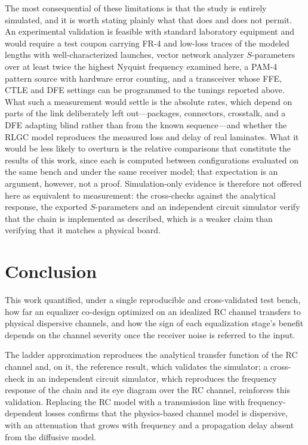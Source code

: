 \documentclass[twocolumn]{USG}
\begin{document}
The most consequential of these limitations is that the study is entirely
simulated, and it is worth stating plainly what that does and does not permit.
An experimental validation is feasible with standard laboratory equipment and
would require a test coupon carrying FR-4 and low-loss traces of the modeled
lengths with well-characterized launches, vector network analyzer
$S$-parameters over at least twice the highest Nyquist frequency examined
here, a PAM-4 pattern source with hardware error counting, and a transceiver
whose FFE, CTLE and DFE settings can be programmed to the tunings reported
above. What such a measurement would settle is the absolute rates, which
depend on parts of the link deliberately left out---packages, connectors,
crosstalk, and a DFE adapting blind rather than from the known sequence---and
whether the RLGC model reproduces the measured loss and delay of real
laminates. What it would be less likely to overturn is the relative
comparisons that constitute the results of this work, since each is computed
between configurations evaluated on the same bench and under the same receiver
model; that expectation is an argument, however, not a proof. Simulation-only
evidence is therefore not offered here as equivalent to measurement: the
cross-checks against the analytical response, the exported $S$-parameters and
an independent circuit simulator verify that the chain is implemented as
described, which is a weaker claim than verifying that it matches a physical
board.

\section{Conclusion}
\label{sec:conclusion}

This work quantified, under a single reproducible and cross-validated test
bench, how far an equalizer co-design optimized on an idealized RC channel
transfers to physical dispersive channels, and how the sign of each
equalization stage's benefit depends on the channel severity once the
receiver noise is referred to the input.

The ladder approximation reproduces the analytical transfer function of the
RC channel and, on it, the reference result, which validates the simulator;
a cross-check in an independent circuit simulator, which reproduces the
frequency response of the chain and its eye diagram over the RC channel,
reinforces this validation. Replacing the RC model with a transmission line
with frequency-dependent losses confirms that the physics-based channel model is
dispersive, with an attenuation that grows with frequency and a propagation
delay absent from the diffusive model.
\end{document}
